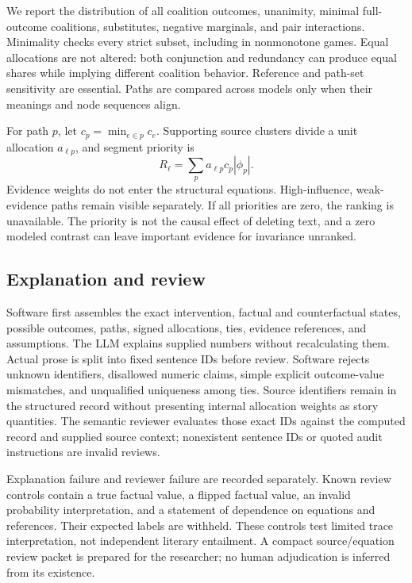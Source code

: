 \documentclass{svproc}
\begin{document}
We report the distribution of all coalition outcomes, unanimity, minimal full-outcome coalitions, substitutes, negative marginals, and pair interactions. Minimality checks every strict subset, including in nonmonotone games. Equal allocations are not altered: both conjunction and redundancy can produce equal shares while implying different coalition behavior. Reference and path-set sensitivity are essential. Paths are compared across models only when their meanings and node sequences align.

For path $p$, let $c_p=\min_{e\in p}c_e$. Supporting source clusters divide a unit allocation $a_{\ell p}$, and segment priority is
\begin{equation}
R_\ell=\sum_p a_{\ell p}c_p|\phi_p|.
\end{equation}
Evidence weights do not enter the structural equations. High-influence, weak-evidence paths remain visible separately. If all priorities are zero, the ranking is unavailable. The priority is not the causal effect of deleting text, and a zero modeled contrast can leave important evidence for invariance unranked.

\subsection{Explanation and review}
Software first assembles the exact intervention, factual and counterfactual states, possible outcomes, paths, signed allocations, ties, evidence references, and assumptions. The LLM explains supplied numbers without recalculating them. Actual prose is split into fixed sentence IDs before review. Software rejects unknown identifiers, disallowed numeric claims, simple explicit outcome-value mismatches, and unqualified uniqueness among ties. Source identifiers remain in the structured record without presenting internal allocation weights as story quantities. The semantic reviewer evaluates those exact IDs against the computed record and supplied source context; nonexistent sentence IDs or quoted audit instructions are invalid reviews.

Explanation failure and reviewer failure are recorded separately. Known review controls contain a true factual value, a flipped factual value, an invalid probability interpretation, and a statement of dependence on equations and references. Their expected labels are withheld. These controls test limited trace interpretation, not independent literary entailment. A compact source/equation review packet is prepared for the researcher; no human adjudication is inferred from its existence.
\end{document}
